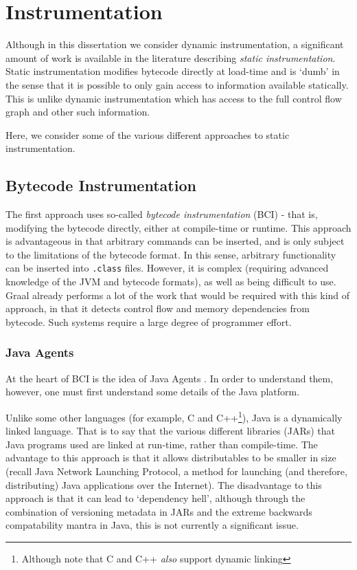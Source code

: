 \section{Instrumentation} \label{sec:related/instrumentation}
Although in this dissertation we consider dynamic instrumentation, a significant amount of work is available in the literature describing \emph{static instrumentation}. Static instrumentation modifies bytecode directly at load-time and is `dumb' in the sense that it is possible to only gain access to information available statically. This is unlike dynamic instrumentation which has access to the full control flow graph and other such information.

Here, we consider some of the various different approaches to static instrumentation.

\subsection{Bytecode Instrumentation} \label{sec:instrumentation/bytecode-instr}
The first approach uses so-called \textit{bytecode instrumentation} (BCI) - that is, modifying the bytecode directly, either at compile-time or runtime. This approach is advantageous in that arbitrary commands can be inserted, and is only subject to the limitations of the bytecode format. In this sense, arbitrary functionality can be inserted into \texttt{.class} files. However, it is complex (requiring advanced knowledge of the JVM and bytecode formats), as well as being difficult to use. Graal already performs a lot of the work that would be required with this kind of approach, in that it detects control flow and memory dependencies from bytecode. Such systems require a large degree of programmer effort.

	\subsubsection{Java Agents} \label{sec:instrumentation/bytecode-instr/agents}
	At the heart of BCI is the idea of Java Agents \citep{javaagents}. In order to understand them, however, one must first understand some details of the Java platform.

	Unlike some other languages (for example, C and C++\footnote{Although note that C and C++ \emph{also} support dynamic linking}), Java is a dynamically linked language. That is to say that the various different libraries (JARs) that Java programs used are linked at run-time, rather than compile-time. The advantage to this approach is that it allows distributables to be smaller in size (recall Java Network Launching Protocol, a method for launching (and therefore, distributing) Java applications over the Internet). The disadvantage to this approach is that it can lead to `dependency hell', although through the combination of versioning metadata in JARs and the extreme backwards compatability mantra in Java, this is not currently a significant issue.

